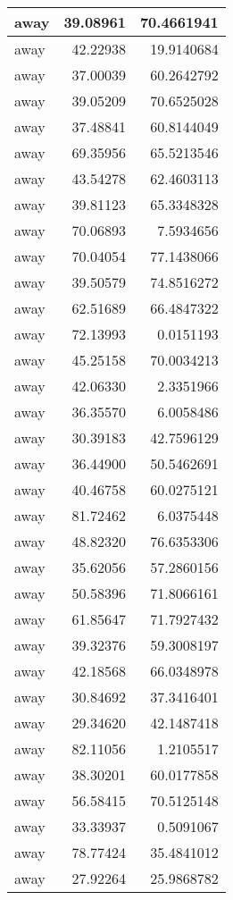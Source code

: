 \documentclass[
]{book}
\theoremstyle{definition}
\theoremstyle{definition}
\theoremstyle{definition}
\theoremstyle{definition}
\theoremstyle{remark}
\begin{document}
\begin{tabular}{l|r|r}
\hline
away & 39.08961 & 70.4661941\\
\hline
away & 42.22938 & 19.9140684\\
\hline
away & 37.00039 & 60.2642792\\
\hline
away & 39.05209 & 70.6525028\\
\hline
away & 37.48841 & 60.8144049\\
\hline
away & 69.35956 & 65.5213546\\
\hline
away & 43.54278 & 62.4603113\\
\hline
away & 39.81123 & 65.3348328\\
\hline
away & 70.06893 & 7.5934656\\
\hline
away & 70.04054 & 77.1438066\\
\hline
away & 39.50579 & 74.8516272\\
\hline
away & 62.51689 & 66.4847322\\
\hline
away & 72.13993 & 0.0151193\\
\hline
away & 45.25158 & 70.0034213\\
\hline
away & 42.06330 & 2.3351966\\
\hline
away & 36.35570 & 6.0058486\\
\hline
away & 30.39183 & 42.7596129\\
\hline
away & 36.44900 & 50.5462691\\
\hline
away & 40.46758 & 60.0275121\\
\hline
away & 81.72462 & 6.0375448\\
\hline
away & 48.82320 & 76.6353306\\
\hline
away & 35.62056 & 57.2860156\\
\hline
away & 50.58396 & 71.8066161\\
\hline
away & 61.85647 & 71.7927432\\
\hline
away & 39.32376 & 59.3008197\\
\hline
away & 42.18568 & 66.0348978\\
\hline
away & 30.84692 & 37.3416401\\
\hline
away & 29.34620 & 42.1487418\\
\hline
away & 82.11056 & 1.2105517\\
\hline
away & 38.30201 & 60.0177858\\
\hline
away & 56.58415 & 70.5125148\\
\hline
away & 33.33937 & 0.5091067\\
\hline
away & 78.77424 & 35.4841012\\
\hline
away & 27.92264 & 25.9868782\\

\end{tabular}
\end{document}
